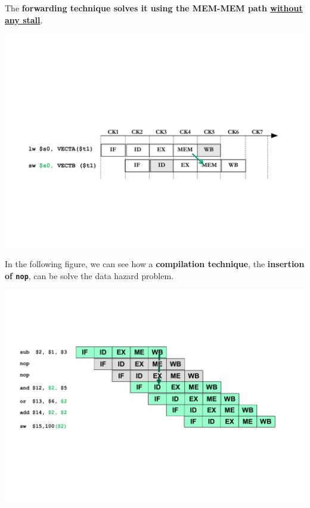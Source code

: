\begin{itemize}
\begin{examplebox}
        The \textbf{forwarding technique solves it using the MEM-MEM path \underline{without any stall}}.
        \begin{center}
            \includegraphics[width=\textwidth]{img/load-store-hazard-problem-2.pdf}
        \end{center}
    \end{examplebox}
\end{itemize}

\begin{examplebox}\label{example: insertion of nop}
    In the following figure, we can see how a \textbf{compilation technique}, the \textbf{insertion of \texttt{nop}}, can be solve the data hazard problem.
    \begin{center}
        \includegraphics[width=\textwidth]{img/insertion-of-nop-1.pdf}
    \end{center}
\end{examplebox}

